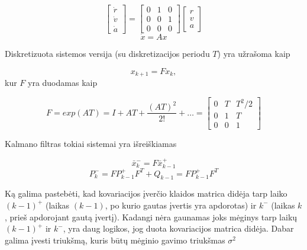     \begin{equation}
        \begin{bmatrix} \dot{r} \\ \dot{v} \\ \dot{a} \end{bmatrix} = 
        \begin{bmatrix} 0 & 1 & 0 \\ 0 & 0 & 1 \\ 0 & 0 & 0 \end{bmatrix}
        \begin{bmatrix} r \\ v \\ a \end{bmatrix}
    \end{equation}
    \begin{equation}
        \dot{x} = Ax
    \end{equation}

    Diskretizuota sistemos versija (su diskretizacijos periodu $T$) yra užrašoma kaip\

    \begin{equation}
        x_{k+1} = Fx_k,
    \end{equation}
    kur $F$ yra duodamas kaip

    \begin{equation}
        F = exp(AT) = I + AT + \frac{(AT)^2}{2!} + \dots =
        \begin{bmatrix}
            0 & T & T^2/2 \\
            0 & 1 & T \\ 
            0 & 0 & 1
        \end{bmatrix}
    \end{equation}

    Kalmano filtras tokiai sistemai yra išreiškiamas

    \begin{equation}
        \bar{x}_k^- = F\bar{x}_{k-1}^+
    \end{equation}
    \begin{equation}
        P_k^- = FP_{k-1}^+ F^T + Q_{k-1} = FP_{k-1}^+ F^T
    \end{equation}

    Ką galima pastebėti, kad kovariacijos įverčio klaidos matrica didėja tarp laiko $(k-1)^+$ (laikas $(k-1)$, po kurio gautas įvertis yra apdorotas) ir $k^-$ (laikas $k$, prieš apdorojant gautą įvertį).
    Kadangi nėra gaunamas joks mėginys tarp laikų $(k-1)^+$ ir $k^-$, yra daug logikos, jog duota kovariacijos matrica didėja.
    Dabar galima įvesti triukšmą, kuris būtų mėginio gavimo triukšmas $\sigma^2$

